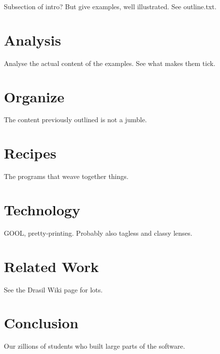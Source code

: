 \documentclass[english,submission]{programming}
\begin{document}
Subsection of intro? But give examples, well illustrated. See outline.txt.

\section{Analysis}
\label{sec:analysis}

Analyse the actual content of the examples. See what makes them tick.

\section{Organize}
\label{sec:organize}

The content previously outlined is not a jumble.

\section{Recipes}
\label{sec:recipes}

The programs that weave together things.

\section{Technology}
\label{sec:tech}

GOOL, pretty-printing. Probably also tagless and classy lenses.

\section{Related Work}
\label{sec:relwork}

See the Drasil Wiki page for lots.

\section{Conclusion}
\label{sec:conc}

\acks
Our zillions of students who built large parts of the software.

\end{document}
